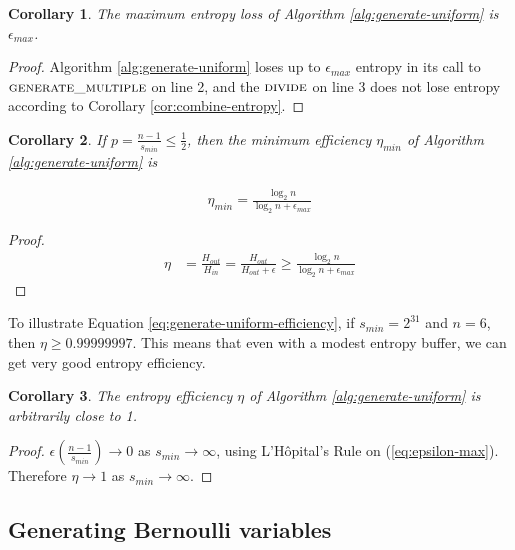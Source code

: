 \documentclass[lettersize,onecolumn]{IEEEtran}
\newtheorem{corollary}{Corollary}
\begin{document}
\begin{corollary}
    The maximum entropy loss of Algorithm \ref{alg:generate-uniform} is $\epsilon_{max}$.
\end{corollary}

\begin{proof}
    Algorithm \ref{alg:generate-uniform} loses up to $\epsilon_{max}$ entropy in its call to $\textsc{generate\_multiple}$ on line 2, and the $\textsc{divide}$ on line 3 does not lose entropy according to Corollary \ref{cor:combine-entropy}.
\end{proof}

\begin{corollary}
    If $p = \frac{n-1}{s_{min}} \le \frac{1}{2}$, then the minimum efficiency $\eta_{min}$ of Algorithm \ref{alg:generate-uniform} is 

\begin{align}
    \label{eq:generate-uniform-efficiency}
    \eta_{min} = \frac{\log_2n}{\log_2n + \epsilon_{max}}
\end{align}
\end{corollary}

\begin{proof}
\begin{align}
    \eta & = \frac{H_{out}}{H_{in}}
          = \frac{H_{out}}{H_{out}+\epsilon} 
          \ge \frac{\log_2n}{\log_2n + \epsilon_{max}}
\end{align}
\end{proof}

To illustrate Equation \ref{eq:generate-uniform-efficiency}, if $s_{min}=2^{31}$ and $n=6$, then $\eta \ge 0.99999997$. This means that even with a modest entropy buffer, we can get very good entropy efficiency.

\begin{corollary}
The entropy efficiency $\eta$ of Algorithm \ref{alg:generate-uniform} is arbitrarily close to 1.
\end{corollary}

\begin{proof}
$\epsilon(\frac{n-1}{s_{min}}) \rightarrow 0$ as $s_{min} \rightarrow \infty$, using L'H\^opital's Rule on (\ref{eq:epsilon-max}). Therefore $\eta \rightarrow 1$ as $s_{min} \rightarrow \infty$.
\end{proof}



\subsection{Generating Bernoulli variables}
\end{document}
